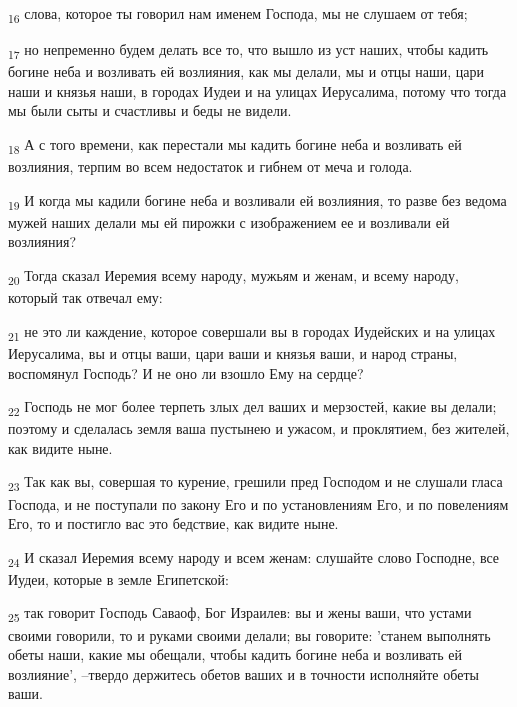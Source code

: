 \begin{tcolorbox}
\textsubscript{16} слова, которое ты говорил нам именем Господа, мы не слушаем от тебя;
\end{tcolorbox}
\begin{tcolorbox}
\textsubscript{17} но непременно будем делать все то, что вышло из уст наших, чтобы кадить богине неба и возливать ей возлияния, как мы делали, мы и отцы наши, цари наши и князья наши, в городах Иудеи и на улицах Иерусалима, потому что тогда мы были сыты и счастливы и беды не видели.
\end{tcolorbox}
\begin{tcolorbox}
\textsubscript{18} А с того времени, как перестали мы кадить богине неба и возливать ей возлияния, терпим во всем недостаток и гибнем от меча и голода.
\end{tcolorbox}
\begin{tcolorbox}
\textsubscript{19} И когда мы кадили богине неба и возливали ей возлияния, то разве без ведома мужей наших делали мы ей пирожки с изображением ее и возливали ей возлияния?
\end{tcolorbox}
\begin{tcolorbox}
\textsubscript{20} Тогда сказал Иеремия всему народу, мужьям и женам, и всему народу, который так отвечал ему:
\end{tcolorbox}
\begin{tcolorbox}
\textsubscript{21} не это ли каждение, которое совершали вы в городах Иудейских и на улицах Иерусалима, вы и отцы ваши, цари ваши и князья ваши, и народ страны, воспомянул Господь? И не оно ли взошло Ему на сердце?
\end{tcolorbox}
\begin{tcolorbox}
\textsubscript{22} Господь не мог более терпеть злых дел ваших и мерзостей, какие вы делали; поэтому и сделалась земля ваша пустынею и ужасом, и проклятием, без жителей, как видите ныне.
\end{tcolorbox}
\begin{tcolorbox}
\textsubscript{23} Так как вы, совершая то курение, грешили пред Господом и не слушали гласа Господа, и не поступали по закону Его и по установлениям Его, и по повелениям Его, то и постигло вас это бедствие, как видите ныне.
\end{tcolorbox}
\begin{tcolorbox}
\textsubscript{24} И сказал Иеремия всему народу и всем женам: слушайте слово Господне, все Иудеи, которые в земле Египетской:
\end{tcolorbox}
\begin{tcolorbox}
\textsubscript{25} так говорит Господь Саваоф, Бог Израилев: вы и жены ваши, что устами своими говорили, то и руками своими делали; вы говорите: 'станем выполнять обеты наши, какие мы обещали, чтобы кадить богине неба и возливать ей возлияние', --твердо держитесь обетов ваших и в точности исполняйте обеты ваши.
\end{tcolorbox}
